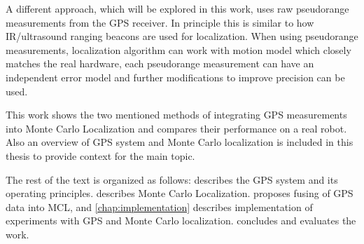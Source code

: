 A different approach, which will be explored in this work, uses raw
pseudorange measurements from the GPS receiver.
In principle this is similar to how IR/ultrasound ranging beacons are used for localization.
When using pseudorange measurements, localization algorithm can work with motion model
which closely matches
the real hardware, each pseudorange measurement can have an
independent error model and further modifications to improve precision can be used.


\vspace{1.5em}


This work shows the two mentioned  methods of integrating GPS measurements
into Monte Carlo Localization and compares their performance on a real robot.
Also an overview of GPS system and Monte Carlo localization is included in
this thesis to provide context for the main topic.


The rest of the text is organized as follows:
 describes the GPS system and its operating principles.
 describes Monte Carlo Localization.
 proposes fusing of GPS data into MCL, and
\cref{chap:implementation} describes implementation of experiments with GPS and
Monte Carlo localization.
 concludes and evaluates the work.
